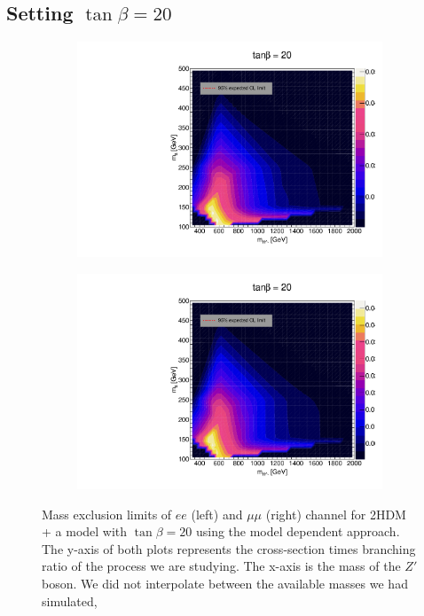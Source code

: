\documentclass[12pt, a4paper]{book}
\begin{document}
\clearpage
\subsection{Setting $\tan\beta=20$}
\begin{figure}[!ht]
	\centering
   \begin{subfigure}[b]{0.49\textwidth}
      \centering
      \includegraphics[width=1\textwidth]{Limits/2HDM/2HDM_ee_tb20.pdf}
      \end{subfigure}
   \hfill
   \begin{subfigure}[b]{0.49\textwidth}
      \centering
      \includegraphics[width=1\textwidth]{Limits/2HDM/2HDM_uu_tb20.pdf}
      \end{subfigure}
   \caption[Expected mass exclusion limits of $ee$ and $\mu\mu$ channel for all 2HDM + a model with $\tan\beta=20$ using the model dependent approach]{Mass exclusion limits of $ee$ (left) and $\mu\mu$ (right) channel for 2HDM + a model with $\tan\beta=20$ using the model dependent approach. The y-axis of both plots represents the cross-section times branching ratio of the process we are studying. The x-axis is the mass of the $Z'$ boson. We did not interpolate between the available masses we had simulated, 
}
\end{figure}
\end{document}
